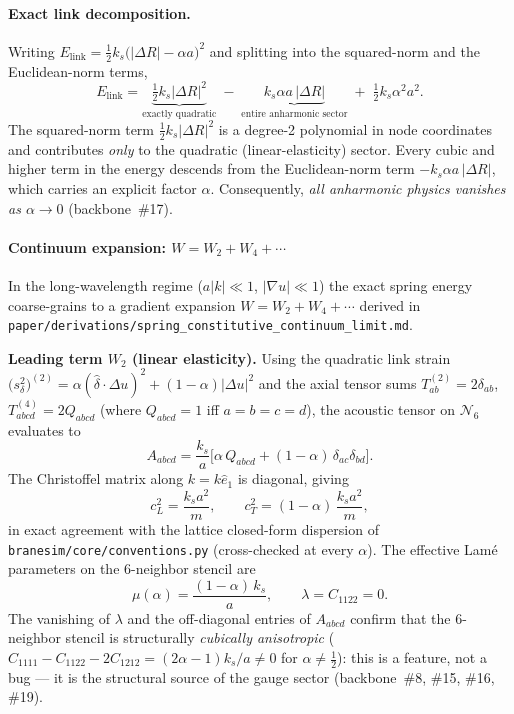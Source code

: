 \paragraph{Exact link decomposition.}
Writing $E_{\mathrm{link}} = \tfrac12 k_s\bigl(|\Delta R|-\alpha a\bigr)^2$ and splitting into the
squared-norm and the Euclidean-norm terms,
\begin{equation}
  E_{\mathrm{link}}
  = \underbrace{\tfrac12 k_s|\Delta R|^2}_{\text{exactly quadratic}}
  \;-\; \underbrace{k_s\alpha a\,|\Delta R|}_{\text{entire anharmonic sector}}
  \;+\; \tfrac12 k_s\alpha^2 a^2.
  \label{eq:link-decomp}
\end{equation}
The squared-norm term $\tfrac12 k_s|\Delta R|^2$ is a degree-2 polynomial in node coordinates and
contributes \emph{only} to the quadratic (linear-elasticity) sector.
Every cubic and higher term in the energy descends from the Euclidean-norm term
$-k_s\alpha a\,|\Delta R|$, which carries an explicit factor $\alpha$.
Consequently, \emph{all anharmonic physics vanishes as $\alpha\to 0$} (backbone~\#17).

\paragraph{Continuum expansion: $W = W_2 + W_4 + \cdots$}
In the long-wavelength regime ($a|k|\ll 1$, $|\nabla u|\ll 1$) the exact spring energy coarse-grains
to a gradient expansion $W = W_2 + W_4 + \cdots$ derived in
\texttt{paper/derivations/spring\_constitutive\_continuum\_limit.md}.

\smallskip
\noindent\textbf{Leading term $W_2$ (linear elasticity).}
Using the quadratic link strain
$\bigl(s_\delta^2\bigr)^{(2)} = \alpha(\hat\delta\cdot\Delta u)^2 + (1-\alpha)|\Delta u|^2$
and the axial tensor sums $T^{(2)}_{ab}=2\delta_{ab}$, $T^{(4)}_{abcd}=2Q_{abcd}$
(where $Q_{abcd}=1$ iff $a=b=c=d$), the acoustic tensor on $\mathcal{N}_6$ evaluates to
\begin{equation}
  A_{abcd} = \frac{k_s}{a}\bigl[\alpha\,Q_{abcd} + (1-\alpha)\,\delta_{ac}\delta_{bd}\bigr].
  \label{eq:acoustic-tensor}
\end{equation}
The Christoffel matrix along $k=k\hat{e}_1$ is diagonal, giving
\begin{equation}
  c_L^2 = \frac{k_s a^2}{m},
  \qquad
  c_T^2 = (1-\alpha)\,\frac{k_s a^2}{m},
  \label{eq:wave-speeds-derived}
\end{equation}
in exact agreement with the lattice closed-form dispersion of \texttt{branesim/core/conventions.py}
(cross-checked at every $\alpha$).
The effective Lam\'e parameters on the 6-neighbor stencil are
\begin{equation}
  \mu(\alpha) = \frac{(1-\alpha)\,k_s}{a},
  \qquad
  \lambda = C_{1122} = 0.
  \label{eq:lame-6neighbor}
\end{equation}
The vanishing of $\lambda$ and the off-diagonal entries of $A_{abcd}$ confirm that the
6-neighbor stencil is structurally \emph{cubically anisotropic}
($C_{1111}-C_{1122}-2C_{1212}=(2\alpha-1)k_s/a\ne0$ for $\alpha\ne\tfrac12$):
this is a feature, not a bug --- it is the structural source of the gauge sector
(backbone~\#8, \#15, \#16, \#19).

